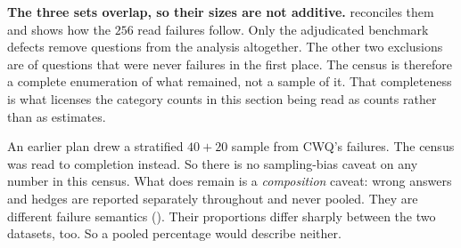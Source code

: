 \textbf{The three sets overlap, so their sizes are not additive.}
 reconciles them and shows how the $256$ read
failures follow. Only the adjudicated benchmark defects remove questions from
the analysis altogether. The other two exclusions are of questions that were
never failures in the first place. The census is therefore a complete
enumeration of what remained, not a sample of it. That completeness is what
licenses the category counts in this section being read as counts rather than
as estimates.

An earlier plan drew a stratified $40 + 20$ sample from CWQ's failures. The
census was read to completion instead. So there is no sampling-bias caveat on
any number in this census. What does remain is a \emph{composition} caveat:
wrong answers and hedges are reported separately throughout and never pooled.
They are different failure semantics (). Their
proportions differ sharply between the two datasets, too. So a pooled
percentage would describe neither.

\endinput
